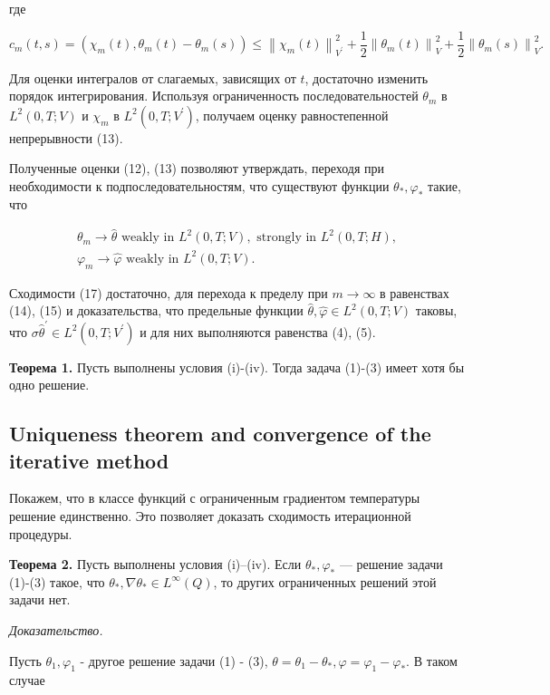 где

\[
    c_{m}(t, s)=\left(\chi_{m}(t), \theta_{m}(t)-\theta_{m}(s)\right)
    \leq\left\|\chi_{m}(t)\right\|_{V^{\prime}}^{2}
    +\frac{1}{2}\left\|\theta_{m}(t)\right\|_{V}^{2}
    +\frac{1}{2}\left\|\theta_{m}(s)\right\|_{V}^{2}.
\]

Для оценки интегралов от слагаемых, зависящих от $t$, достаточно изменить порядок интегрирования.
Используя ограниченность последовательностей
$\theta_{m}$ в $L^{2}(0, T ; V)$ и $\chi_{m}$ в $L^{2}\left(0, T ; V^{\prime}\right)$,
получаем оценку равностепенной непрерывности (13).

Полученные оценки (12), (13) позволяют утверждать, переходя при необходимости к подпоследовательностям,
что существуют функции $\theta_{*}, \varphi_{*}$ такие, что

\[
    \begin{aligned}
        \theta_{m} \rightarrow \widehat{\theta} \text { weakly in } L^{2}(0, T ; V), \text { strongly in } L^{2}(0, T ; H), \\
        \varphi_{m} \rightarrow \widehat{\varphi} \text { weakly in } L^{2}(0, T ; V) .
    \end{aligned}
\]

Сходимости (17) достаточно, для перехода к пределу при $m \rightarrow \infty$
в равенствах (14), (15) и доказательства,
что предельные функции $\widehat{\theta}, \widehat{\varphi } \in L^{2}(0, T ; V)$ таковы,
что $\sigma \widehat{\theta}^{\prime} \in L^{2}\left(0, T ; V^{ \prime}\right)$
и для них выполняются равенства (4), (5).


\textbf{Теорема 1.}
Пусть выполнены условия (i)-(iv).
Тогда задача (1)-(3) имеет хотя бы одно решение.

\subsection{Uniqueness theorem and convergence of the iterative method}\label{subsec:ch3:sec1:subsec4}
Покажем, что в классе функций с ограниченным градиентом температуры решение единственно.
Это позволяет доказать сходимость итерационной процедуры.

\textbf{Теорема 2.}
Пусть выполнены условия (i)–(iv).
Если $\theta_{*}, \varphi_{*}$ — решение задачи (1)-(3) такое,
что $\theta_{*}, \nabla \theta_{*} \in L^{\infty }(Q)$, то других ограниченных решений этой задачи нет.

\textit{Доказательство.}

Пусть $\theta_{1}, \varphi_{1}$ - другое решение задачи (1) - (3),
$\theta=\theta_{1}-\theta_{*}, \varphi=\varphi_{ 1}-\varphi_{*}$.
В таком случае

